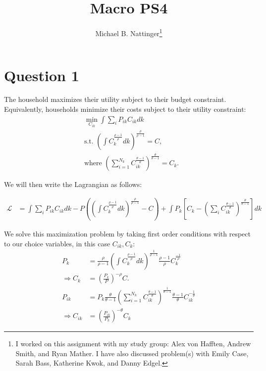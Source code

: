 \documentclass[11pt]{article} %
\title{Macro PS4}
\author{Michael B. Nattinger\footnote{I worked on this assignment with my study group: Alex von Hafften, Andrew Smith, and Ryan Mather. I have also discussed problem(s) with Emily Case, Sarah Bass, Katherine Kwok, and Danny Edgel.}}
\begin{document}
\maketitle
\section{Question 1}
The household maximizes their utility subject to their budget constraint. Equivalently, households minimize their costs subject to their utility constraint:
\begin{align*}
&\min_{C_{ik}} \int \sum_i P_{ik} C_{ik} dk\\
&\text{s.t. } \left( \int C_k^{\frac{\rho - 1}{\rho}} dk \right)^{\frac{\rho}{\rho - 1}} = C,\\
&\text{where } \left( \sum_{i=1}^{N_k} C_{ik}^{\frac{\theta - 1}{\theta}} \right)^{\frac{\theta}{\theta - 1}} = C_k.
\end{align*}

We will then write the Lagrangian as follows:

\begin{align*}
\mathcal{L} &=\int \sum_i P_{ik} C_{ik} dk - P\left(  \left( \int C_k^{\frac{\rho - 1}{\rho}} dk\right)^{\frac{\rho}{\rho - 1}} - C \right) + \int P_k\left[C_k - \left( \sum_i C_{ik}^{\frac{\theta - 1}{\theta}}\right)^{\frac{\theta}{\theta - 1}} \right] dk
\end{align*}

We solve this maximization problem by taking first order conditions with respect to our choice variables, in this case $C_{ik},C_k$:
\begin{align*}
P_{k}  &= \frac{\rho}{\rho - 1} \left( \int C_k^{\frac{\rho - 1}{\rho}} dk \right)^{\frac{1}{\rho - 1}}\frac{\rho - 1}{\rho}C_k^{\frac{-1}{\rho}}\\
\Rightarrow C_k &= \left(\frac{P_k}{P}\right)^{-\rho} C. \\
P_{ik} &= P_k  \frac{\theta}{\theta - 1}\left( \sum_{i=1}^{N_k} C_{ik}^{\frac{\theta - 1}{\theta}} \right)^{\frac{1}{\theta - 1}} \frac{\theta - 1}{\theta}C_{ik}^{-\frac{1}{\theta}}\\
\Rightarrow C_{ik} &= \left(\frac{P_{ik}}{P_{k}}\right)^{-\theta}C_{k}
\end{align*}
%
\end{document}
